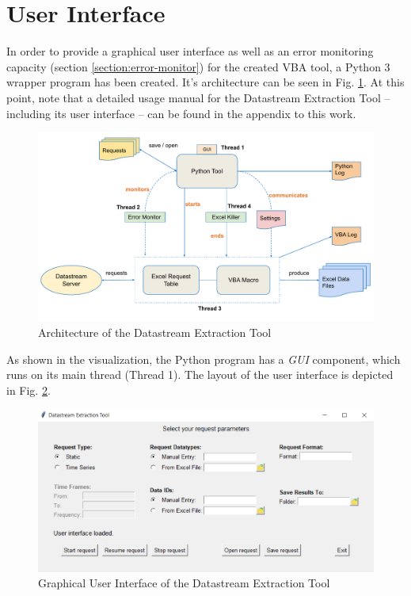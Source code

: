 \section{User Interface} \label{section:user-interface}
In order to provide a graphical user interface as well as an error monitoring capacity (section \ref{section:error-monitor}) for the created VBA tool, a Python 3 wrapper program has been created. It's architecture can be seen in Fig. \ref{fig:ds-extraction-tool-architecture}. At this point, note that a detailed usage manual for the Datastream Extraction Tool -- including its user interface -- can be found in the appendix to this work. %

\begin{figure}[h]
	\centering
	\includegraphics[width=1.1\linewidth]{figures/ds-extraction-tool-architecture}
	\caption{Architecture of the Datastream Extraction Tool}
	\label{fig:ds-extraction-tool-architecture}
\end{figure}

As shown in the visualization, the Python program has a \textit{GUI} component, which runs on its main thread (Thread 1). The layout of the user interface is depicted in Fig. \ref{fig:gui}. 

\begin{figure}[h]
	\centering
	\includegraphics[width=1.1\linewidth]{figures/gui.png}
	\caption{Graphical User Interface of the Datastream Extraction Tool}
	\label{fig:gui}
\end{figure}

